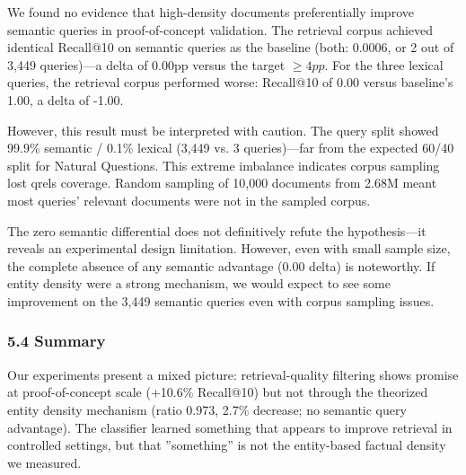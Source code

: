 We found no evidence that high-density documents preferentially improve semantic queries in proof-of-concept validation. The retrieval corpus achieved identical Recall@10 on semantic queries as the baseline (both: 0.0006, or 2 out of 3,449 queries)---a delta of 0.00pp versus the target $\geq 4pp$. For the three lexical queries, the retrieval corpus performed worse: Recall@10 of 0.00 versus baseline's 1.00, a delta of -1.00.

However, this result must be interpreted with caution. The query split showed 99.9\% semantic / 0.1\% lexical (3,449 vs. 3 queries)---far from the expected 60/40 split for Natural Questions. This extreme imbalance indicates corpus sampling lost qrels coverage. Random sampling of 10,000 documents from 2.68M meant most queries' relevant documents were not in the sampled corpus.

The zero semantic differential does not definitively refute the hypothesis---it reveals an experimental design limitation. However, even with small sample size, the complete absence of any semantic advantage (0.00 delta) is noteworthy. If entity density were a strong mechanism, we would expect to see some improvement on the 3,449 semantic queries even with corpus sampling issues.

\subsubsection{5.4 Summary}

Our experiments present a mixed picture: retrieval-quality filtering shows promise at proof-of-concept scale (+10.6\% Recall@10) but not through the theorized entity density mechanism (ratio 0.973, 2.7\% decrease; no semantic query advantage). The classifier learned something that appears to improve retrieval in controlled settings, but that ''something'' is not the entity-based factual density we measured.
